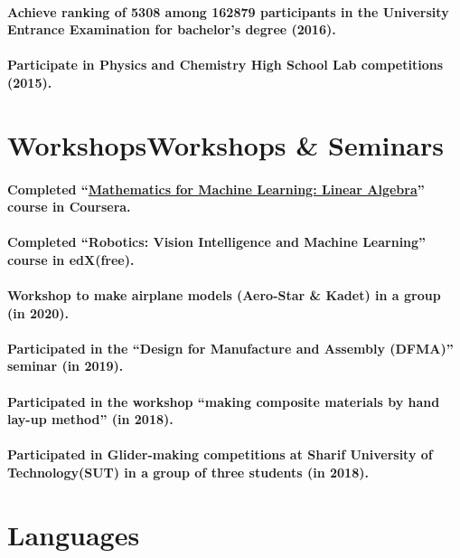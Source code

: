 \documentclass[a4paper]{article}
\begin{document}
        \paragraph{Achieve ranking of 5308 among 162879 participants in the University Entrance Examination for bachelor's degree (2016).}
        \paragraph{Participate in Physics and Chemistry High School Lab competitions (2015).}
    \section{WorkshopsWorkshops \& Seminars}
        \paragraph{Completed “\href{https://coursera.org/share/727feebde54da2fa7042a84ce71c53e7}{Mathematics for Machine Learning: Linear Algebra}” course in Coursera.}
        \paragraph{Completed “Robotics: Vision Intelligence and Machine Learning” course in edX(free).}
        \paragraph{Workshop to make airplane models (Aero-Star \& Kadet) in a group (in 2020).}
        \paragraph{Participated in the “Design for Manufacture and Assembly (DFMA)” seminar (in 2019).}
        \paragraph{Participated in the workshop “making composite materials by hand lay-up method” (in 2018).}
        \paragraph{Participated in Glider-making competitions at Sharif University of Technology(SUT) in a group of three students (in 2018).}
    \section{Languages}
\end{document}
